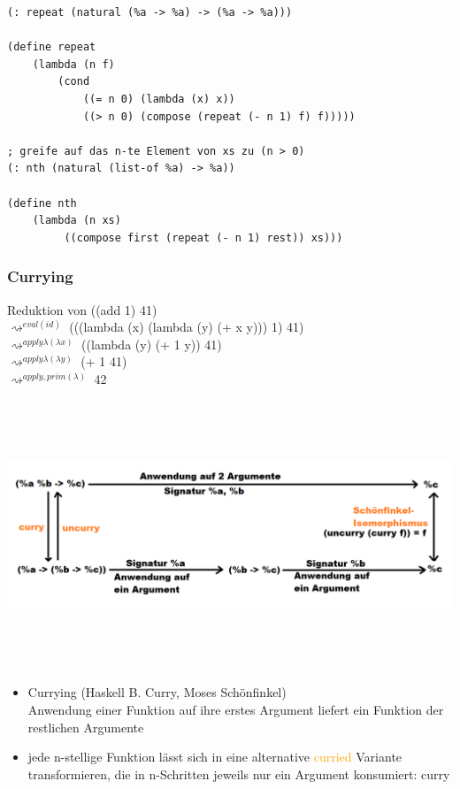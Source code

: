 \documentclass[paper=a4, fontsize=11pt]{scrartcl}
\numberwithin{equation}{section}
\numberwithin{figure}{section}
\numberwithin{table}{section}
\begin{document}
\begin{lstlistig}
\begin{lstlisting}
(: repeat (natural (%a -> %a) -> (%a -> %a)))

(define repeat
    (lambda (n f)
        (cond
            ((= n 0) (lambda (x) x))
            ((> n 0) (compose (repeat (- n 1) f) f)))))
            
; greife auf das n-te Element von xs zu (n > 0)
(: nth (natural (list-of %a) -> %a))

(define nth 
    (lambda (n xs)
         ((compose first (repeat (- n 1) rest)) xs)))            
\end{lstlisting}

\subsubsection{Currying}
Reduktion von ((add 1) 41) \\
$\rightsquigarrow^{eval(id)}$ (((lambda (x) (lambda (y) (+ x y))) 1) 41) \\
$\rightsquigarrow^{apply \lambda (\lambda x)}$ ((lambda (y) (+ 1 y)) 41) \\
$\rightsquigarrow^{apply \lambda (\lambda y)}$ (+ 1 41) \\
$\rightsquigarrow^{apply, prim(\lambda)}$ 42

\includegraphics[width=15cm,height=8cm]{currying.png}

\begin{itemize}
\item Currying (Haskell B. Curry, Moses Schönfinkel) \\
        Anwendung einer Funktion auf ihre erstes Argument liefert ein Funktion der restlichen Argumente 
\item jede n-stellige Funktion lässt sich in eine alternative \textcolor{orange}{curried} Variante transformieren, die in n-Schritten jeweils nur ein Argument konsumiert: curry
\end{itemize}


\end{lstlistig}
\end{document}
